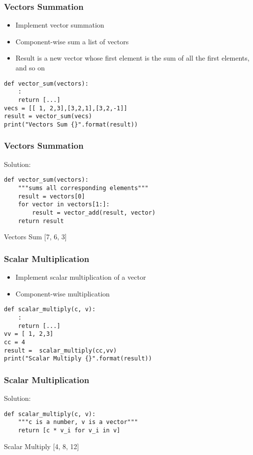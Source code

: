 \begin{frame}[fragile]\frametitle{Vectors Summation}
\begin{itemize}
\item Implement vector summation
\item Component-wise sum a list of vectors
\item Result is a new vector whose first element is the sum of all the first elements, and so on
\end{itemize}
\begin{lstlisting}
def vector_sum(vectors):
	:
	return [...]
vecs = [[ 1, 2,3],[3,2,1],[3,2,-1]]
result = vector_sum(vecs)
print("Vectors Sum {}".format(result))
\end{lstlisting}
\end{frame}

\begin{frame}[fragile]\frametitle{Vectors Summation}
Solution:
\begin{lstlisting}
def vector_sum(vectors):
    """sums all corresponding elements"""
    result = vectors[0]
    for vector in vectors[1:]:     
        result = vector_add(result, vector)    
    return result
\end{lstlisting}
Vectors Sum [7, 6, 3]
\end{frame}

\begin{frame}[fragile]\frametitle{Scalar Multiplication}
\begin{itemize}
\item Implement scalar multiplication of a vector
\item Component-wise multiplication
\end{itemize}
\begin{lstlisting}
def scalar_multiply(c, v):
	:
	return [...]
vv = [ 1, 2,3]
cc = 4
result =  scalar_multiply(cc,vv)
print("Scalar Multiply {}".format(result))
\end{lstlisting}
\end{frame}

\begin{frame}[fragile]\frametitle{Scalar Multiplication}
Solution:
\begin{lstlisting}
def scalar_multiply(c, v):
    """c is a number, v is a vector"""
    return [c * v_i for v_i in v]
\end{lstlisting}
Scalar Multiply [4, 8, 12]
\end{frame}

